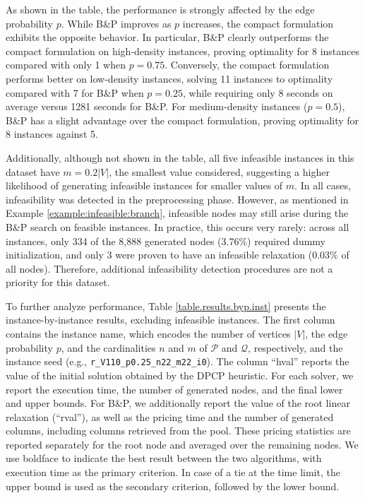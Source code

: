 \documentclass[preprint, 11pt, authoryear]{elsarticle}
\begin{document}
As shown in the table, the performance is strongly affected by the edge probability $p$. 
While B\&P improves as $p$ increases, the compact formulation exhibits the opposite behavior. 
In particular, B\&P clearly outperforms the compact formulation on high-density instances, proving optimality for 8 instances compared with only 1 when $p = 0.75$. 
Conversely, the compact formulation performs better on low-density instances, solving 11 instances to optimality compared with 7 for B\&P when $p = 0.25$, while requiring only 8 seconds on average versus 1281 seconds for B\&P. 
For medium-density instances ($p = 0.5$), B\&P has a slight advantage over the compact formulation, proving optimality for 8 instances against 5.

Additionally, although not shown in the table, all five infeasible instances in this dataset have $m=0.2|V|$, the smallest value considered, suggesting a higher likelihood of generating infeasible instances for smaller values of $m$. In all cases, infeasibility was detected in the preprocessing phase.
However, as mentioned in Example \ref{example:infeasible:branch}, infeasible nodes may still arise during the B\&P search on feasible instances.
In practice, this occurs very rarely: across all instances, only 334 of the 8,888 generated nodes (3.76\%) required dummy initialization, and only 3 were proven to have an infeasible relaxation (0.03\% of all nodes).
Therefore, additional infeasibility detection procedures are not a priority for this dataset.


To further analyze performance, Table \ref{table.results.byp.inst} presents the instance-by-instance results, excluding infeasible instances.
The first column contains the instance name, which encodes the number of vertices $|V|$, the edge probability $p$, and the cardinalities $n$ and $m$ of $\mathcal{P}$ and $\mathcal{Q}$, respectively, and the instance seed (e.g., \texttt{r\_V110\_p0.25\_n22\_m22\_i0}).
The column ``hval'' reports the value of the initial solution obtained by the DPCP heuristic.
For each solver, we report the execution time, the number of generated nodes, and the final lower and upper bounds.
For B\&P, we additionally report the value of the root linear relaxation (``rval''), as well as the pricing time and the number of generated columns, including columns retrieved from the pool. These pricing statistics are reported separately for the root node and averaged over the remaining nodes.
We use boldface to indicate the best result between the two algorithms, with execution time as the primary criterion. In case of a tie at the time limit, the upper bound is used as the secondary criterion, followed by the lower bound.
\end{document}
